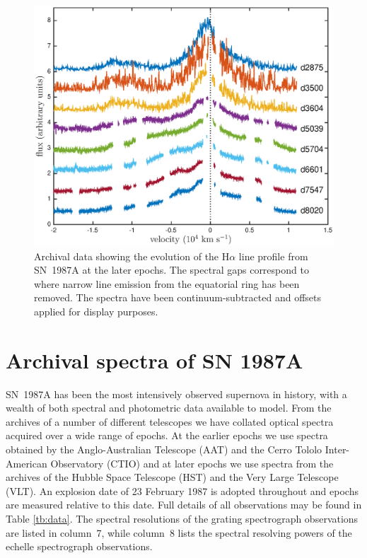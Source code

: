 \documentclass[useAMS,usenatbib,usegraphicx]{mnras}
\begin{document}

\begin{figure}
\includegraphics[trim =45 10 45 15,clip=true,scale=0.51]{Ha_evol_late_1col}
\caption{Archival data showing the evolution of the H$\alpha$
line profile from SN~1987A at the later epochs. The spectral gaps 
correspond to where narrow line emission from the equatorial ring has been 
removed. The spectra have been continuum-subtracted and offsets applied 
for display purposes.}
\label{Ha_evol_late}
\end{figure}


\section{Archival spectra of SN 1987A}
\label{spectra}

SN~1987A has been the most intensively observed supernova in history, with 
a wealth of both spectral and photometric data available to model.  From 
the archives of a number of different telescopes we have collated optical 
spectra acquired over a wide range of epochs.  At the earlier epochs we 
use spectra obtained by the Anglo-Australian Telescope (AAT) and the Cerro 
Tololo Inter-American Observatory (CTIO) and at later epochs we 
use spectra from the archives of the Hubble Space Telescope (HST) and the Very 
Large Telescope (VLT).  An explosion date of 23 February 1987 is adopted 
throughout and epochs are measured relative to this date.  Full details of 
all observations may be found in Table \ref{tb:data}. The spectral 
resolutions of the grating spectrograph observations are listed in 
column~7, while column~8 lists the spectral resolving powers of the 
echelle spectrograph observations.
\end{document}
